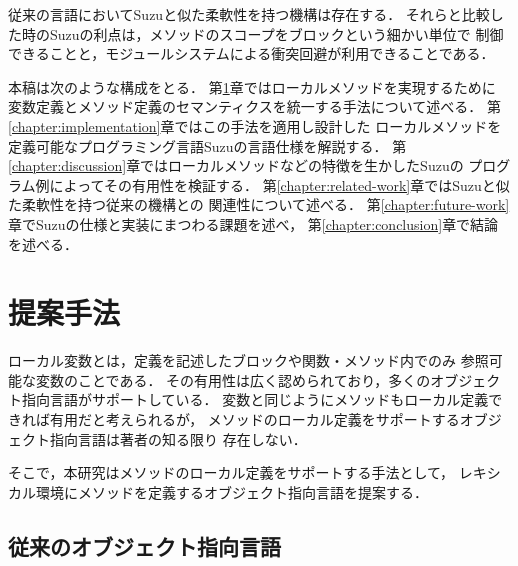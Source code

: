 \documentclass[a4paper,11pt,dvipdfmx]{jreport}
\begin{document}
従来の言語においてSuzuと似た柔軟性を持つ機構は存在する．
それらと比較した時のSuzuの利点は，メソッドのスコープをブロックという細かい単位で
制御できることと，モジュールシステムによる衝突回避が利用できることである．

本稿は次のような構成をとる．
第\ref{chapter:proposal}章ではローカルメソッドを実現するために
変数定義とメソッド定義のセマンティクスを統一する手法について述べる．
第\ref{chapter:implementation}章ではこの手法を適用し設計した
ローカルメソッドを定義可能なプログラミング言語Suzuの言語仕様を解説する．
第\ref{chapter:discussion}章ではローカルメソッドなどの特徴を生かしたSuzuの
プログラム例によってその有用性を検証する．
第\ref{chapter:related-work}章ではSuzuと似た柔軟性を持つ従来の機構との
関連性について述べる．
第\ref{chapter:future-work}章でSuzuの仕様と実装にまつわる課題を述べ，
第\ref{chapter:conclusion}章で結論を述べる．


\chapter{提案手法}
\label{chapter:proposal}

ローカル変数とは，定義を記述したブロックや関数・メソッド内でのみ
参照可能な変数のことである．
その有用性は広く認められており，多くのオブジェクト指向言語がサポートしている．
変数と同じようにメソッドもローカル定義できれば有用だと考えられるが，
メソッドのローカル定義をサポートするオブジェクト指向言語は著者の知る限り
存在しない．

そこで，本研究はメソッドのローカル定義をサポートする手法として，
レキシカル環境にメソッドを定義するオブジェクト指向言語を提案する．

\section{従来のオブジェクト指向言語}
\end{document}
